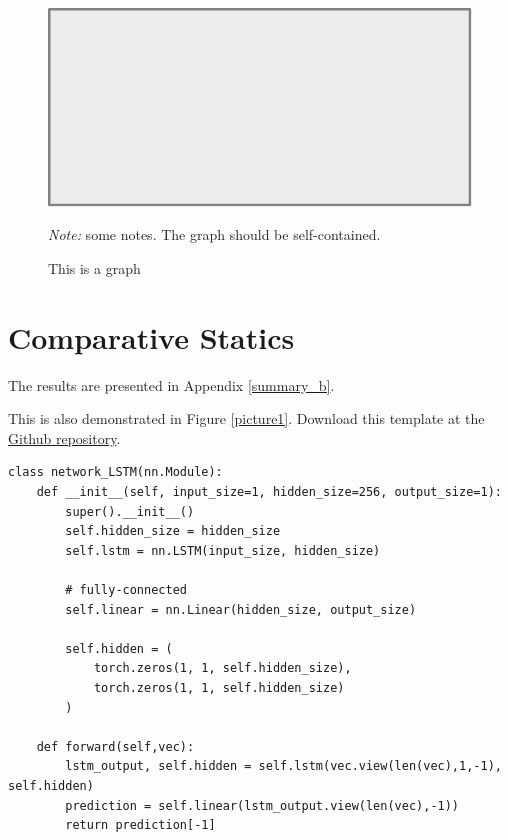 \documentclass[11pt, letterpaper]{article}
\begin{document}
\begin{figure}[H]
  \centering
  \caption{This is a graph}
  \includegraphics[scale=0.5]{Graph/pic.pdf}
  \hspace*{-0.6cm}
  \begin{minipage}{0.9\textwidth}
    \onehalfspacing
    \vspace*{0.12cm}
    \begin{tablenotes}
      \footnotesize
      \item\textit{Note:} some notes. The graph should be self-contained. \lipsum[66]
    \end{tablenotes}
  \end{minipage}
\end{figure}

\section{Comparative Statics}
\lipsum[6] The results are presented in Appendix \ref{summary_b}.

This is also demonstrated in Figure \ref{picture1}. Download this template at the \href{https://github.com/howardhsumail/Thesis-LaTeX-Template.git}{Github repository}.

\begin{lstlisting}[style=python_code, caption={Long short-term memory}, label=mypythoncode]
class network_LSTM(nn.Module):
    def __init__(self, input_size=1, hidden_size=256, output_size=1):
        super().__init__()
        self.hidden_size = hidden_size
        self.lstm = nn.LSTM(input_size, hidden_size)

        # fully-connected
        self.linear = nn.Linear(hidden_size, output_size)

        self.hidden = (
            torch.zeros(1, 1, self.hidden_size),
            torch.zeros(1, 1, self.hidden_size)
        )

    def forward(self,vec):
        lstm_output, self.hidden = self.lstm(vec.view(len(vec),1,-1), self.hidden)
        prediction = self.linear(lstm_output.view(len(vec),-1))
        return prediction[-1]
\end{lstlisting}
\end{document}

